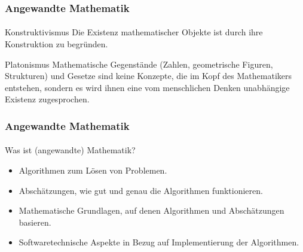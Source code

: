 \documentclass{beamer}
\begin{document}
\begin{frame}
    \frametitle{Angewandte Mathematik}
\framesubtitle{}
    \begin{block}{Konstruktivismus}
Die Existenz mathematischer Objekte ist durch ihre Konstruktion zu begründen. 
\end{block}
    \begin{block}{Platonismus}
Mathematische Gegenstände (Zahlen, geometrische Figuren, Strukturen) und Gesetze sind keine Konzepte, die im Kopf des Mathematikers entstehen, 
sondern es wird ihnen eine vom menschlichen Denken unabhängige Existenz zugesprochen.
\end{block}
 \end{frame}


\begin{frame}
    \frametitle{Angewandte Mathematik}
\framesubtitle{}
    \begin{block}{Was ist (angewandte) Mathematik?}
\begin{itemize}
\item Algorithmen zum Lösen von Problemen.
 \item Abschätzungen, wie gut und genau die Algorithmen funktionieren.
 \item Mathematische Grundlagen, auf denen Algorithmen und Abschätzungen basieren. 
 \item Softwaretechnische Aspekte in Bezug auf  Implementierung der Algorithmen.
\end{itemize}
\end{block}
 \end{frame}
\end{document}
